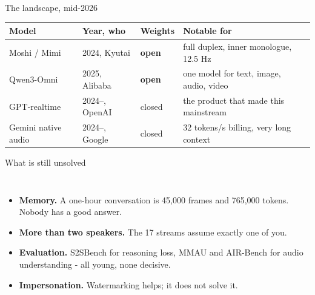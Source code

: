 \documentclass[aspectratio=169]{beamer}
\begin{document}
\begin{frame}{The landscape, mid-2026}
  \small
  \begin{center}
    \footnotesize
    \begin{tabular}{llll}
      \toprule
      \textbf{Model} & \textbf{Year, who} & \textbf{Weights} & \textbf{Notable for} \\
      \midrule
      Moshi / Mimi & 2024, Kyutai & \textbf{open} & full duplex, inner monologue, 12.5 Hz \\
      Qwen3-Omni & 2025, Alibaba & \textbf{open} & one model for text, image, audio, video \\
      GPT-realtime & 2024--, OpenAI & closed & the product that made this mainstream \\
      Gemini native audio & 2024--, Google & closed & 32 tokens/s billing, very long context \\
      \bottomrule
    \end{tabular}
  \end{center}
  \vskip 8pt
\end{frame}

\begin{frame}{What is still unsolved}
  \small
  \begin{columns}[T]
    \footnotesize
    \begin{itemize}\itemsep3pt
      \item \textbf{Memory.} A one-hour conversation is 45,000 frames and 765,000 tokens.
        Nobody has a good answer.
      \item \textbf{More than two speakers.} The 17 streams assume exactly one of you.
      \item \textbf{Evaluation.} S2SBench for reasoning loss, MMAU and AIR-Bench for audio
        understanding - all young, none decisive.
      \item \textbf{Impersonation.} Watermarking helps; it does not solve it.
    \end{itemize}
  \end{columns}
\end{frame}
\end{document}
